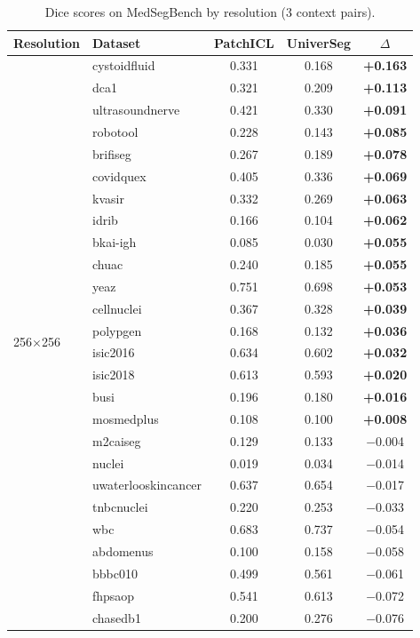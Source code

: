 \documentclass[runningheads]{llncs}
\begin{document}
\begin{table}[t]
\centering
\caption{Dice scores on MedSegBench by resolution (3 context pairs).}\label{tab:medsegbench_resolution}
\small
\begin{tabular}{llccc}
\toprule
Resolution & Dataset & PatchICL & UniverSeg & $\Delta$ \\
\midrule
\multirow{35}{*}{256$\times$256} & cystoidfluid & 0.331 & 0.168 & \textbf{+0.163} \\
 & dca1 & 0.321 & 0.209 & \textbf{+0.113} \\
 & ultrasoundnerve & 0.421 & 0.330 & \textbf{+0.091} \\
 & robotool & 0.228 & 0.143 & \textbf{+0.085} \\
 & brifiseg & 0.267 & 0.189 & \textbf{+0.078} \\
 & covidquex & 0.405 & 0.336 & \textbf{+0.069} \\
 & kvasir & 0.332 & 0.269 & \textbf{+0.063} \\
 & idrib & 0.166 & 0.104 & \textbf{+0.062} \\
 & bkai-igh & 0.085 & 0.030 & \textbf{+0.055} \\
 & chuac & 0.240 & 0.185 & \textbf{+0.055} \\
 & yeaz & 0.751 & 0.698 & \textbf{+0.053} \\
 & cellnuclei & 0.367 & 0.328 & \textbf{+0.039} \\
 & polypgen & 0.168 & 0.132 & \textbf{+0.036} \\
 & isic2016 & 0.634 & 0.602 & \textbf{+0.032} \\
 & isic2018 & 0.613 & 0.593 & \textbf{+0.020} \\
 & busi & 0.196 & 0.180 & \textbf{+0.016} \\
 & mosmedplus & 0.108 & 0.100 & \textbf{+0.008} \\
 & m2caiseg & 0.129 & 0.133 & $-$0.004 \\
 & nuclei & 0.019 & 0.034 & $-$0.014 \\
 & uwaterlooskincancer & 0.637 & 0.654 & $-$0.017 \\
 & tnbcnuclei & 0.220 & 0.253 & $-$0.033 \\
 & wbc & 0.683 & 0.737 & $-$0.054 \\
 & abdomenus & 0.100 & 0.158 & $-$0.058 \\
 & bbbc010 & 0.499 & 0.561 & $-$0.061 \\
 & fhpsaop & 0.541 & 0.613 & $-$0.072 \\
 & chasedb1 & 0.200 & 0.276 & $-$0.076 \\

\end{tabular}
\end{table}
\end{document}
